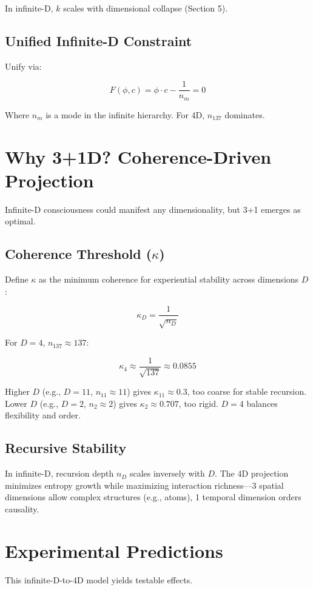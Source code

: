 \documentclass[12pt]{article}
\begin{document}
In infinite-D, \(k\) scales with dimensional collapse (Section 5).

\subsection{Unified Infinite-D Constraint}
Unify via:

\[
F(\phi, c) = \phi \cdot c - \frac{1}{n_m} = 0
\]

Where \(n_m\) is a mode in the infinite hierarchy. For 4D, \(n_{137}\) dominates.

\section{Why 3+1D? Coherence-Driven Projection}

Infinite-D consciousness could manifest any dimensionality, but 3+1 emerges as optimal.

\subsection{Coherence Threshold (\(\kappa\))}
Define \(\kappa\) as the minimum coherence for experiential stability across dimensions \(D\):

\[
\kappa_D = \frac{1}{\sqrt{n_D}}
\]

For \(D = 4\), \(n_{137} \approx 137\):

\[
\kappa_4 \approx \frac{1}{\sqrt{137}} \approx 0.0855
\]

Higher \(D\) (e.g., \(D = 11\), \(n_{11} \approx 11\)) gives \(\kappa_{11} \approx 0.3\), too coarse for stable recursion. Lower \(D\) (e.g., \(D = 2\), \(n_2 \approx 2\)) gives \(\kappa_2 \approx 0.707\), too rigid. \(D = 4\) balances flexibility and order.

\subsection{Recursive Stability}
In infinite-D, recursion depth \(n_D\) scales inversely with \(D\). The 4D projection minimizes entropy growth while maximizing interaction richness—3 spatial dimensions allow complex structures (e.g., atoms), 1 temporal dimension orders causality.

\section{Experimental Predictions}

This infinite-D-to-4D model yields testable effects.
\end{document}
